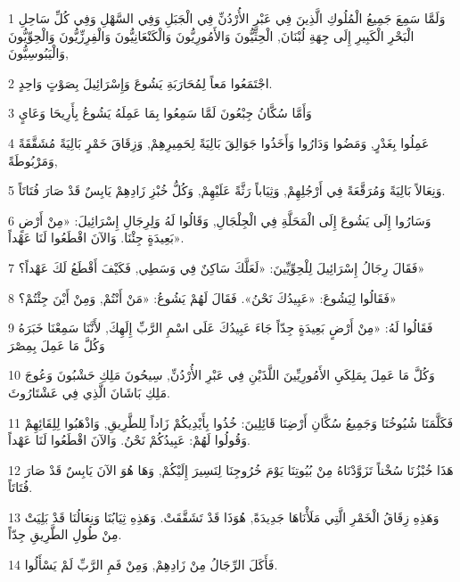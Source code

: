 \par 1 وَلَمَّا سَمِعَ جَمِيعُ الْمُلُوكِ الَّذِينَ فِي عَبْرِ الأُرْدُنِّ فِي الْجَبَلِ وَفِي السَّهْلِ وَفِي كُلِّ سَاحِلِ الْبَحْرِ الْكَبِيرِ إِلَى جِهَةِ لُبْنَانَ, الْحِثِّيُّونَ وَالأَمُورِيُّونَ وَالْكَنْعَانِيُّونَ وَالْفِرِزِّيُّونَ وَالْحِوِّيُّونَ وَالْيَبُوسِيُّونَ,
\par 2 اجْتَمَعُوا مَعاً لِمُحَارَبَةِ يَشُوعَ وَإِسْرَائِيلَ بِصَوْتٍ وَاحِدٍ.
\par 3 وَأَمَّا سُكَّانُ جِبْعُونَ لَمَّا سَمِعُوا بِمَا عَمِلَهُ يَشُوعُ بِأَرِيحَا وَعَايٍ
\par 4 عَمِلُوا بِغَدْرٍ, وَمَضُوا وَدَارُوا وَأَخَذُوا جَوَالِقَ بَالِيَةً لِحَمِيرِهِمْ, وَزِقَاقَ خَمْرٍ بَالِيَةً مُشَقَّقَةً وَمَرْبُوطَةً,
\par 5 وَنِعَالاً بَالِيَةً وَمُرَقَّعَةً فِي أَرْجُلِهِمْ, وَثِيَاباً رَثَّةً عَلَيْهِمْ, وَكُلُّ خُبْزِ زَادِهِمْ يَابِسٌ قَدْ صَارَ فُتَاتَاً.
\par 6 وَسَارُوا إِلَى يَشُوعَ إِلَى الْمَحَلَّةِ فِي الْجِلْجَالِ, وَقَالُوا لَهُ وَلِرِجَالِ إِسْرَائِيلَ: «مِنْ أَرْضٍ بَعِيدَةٍ جِئْنَا. وَالآنَ اقْطَعُوا لَنَا عَهْداً».
\par 7 فَقَالَ رِجَالُ إِسْرَائِيلَ لِلْحِوِّيِّينَ: «لَعَلَّكَ سَاكِنٌ فِي وَسَطِي, فَكَيْفَ أَقْطَعُ لَكَ عَهْداً؟»
\par 8 فَقَالُوا لِيَشُوعَ: «عَبِيدُكَ نَحْنُ». فَقَالَ لَهُمْ يَشُوعُ: «مَنْ أَنْتُمْ, وَمِنْ أَيْنَ جِئْتُمْ؟»
\par 9 فَقَالُوا لَهُ: «مِنْ أَرْضٍ بَعِيدَةٍ جِدّاً جَاءَ عَبِيدُكَ عَلَى اسْمِ الرَّبِّ إِلَهِكَ, لأَنَّنَا سَمِعْنَا خَبَرَهُ وَكُلَّ مَا عَمِلَ بِمِصْرَ
\par 10 وَكُلَّ مَا عَمِلَ بِمَلِكَيِ الأَمُورِيِّينَ اللَّذَيْنِ فِي عَبْرِ الأُرْدُنِّ, سِيحُونَ مَلِكِ حَشْبُونَ وَعُوجَ مَلِكِ بَاشَانَ الَّذِي فِي عَشْتَارُوثَ.
\par 11 فَكَلَّمَنَا شُيُوخُنَا وَجَمِيعُ سُكَّانِ أَرْضِنَا قَائِلِينَ: خُذُوا بِأَيْدِيكُمْ زَاداً لِلطَّرِيقِ, وَاذْهَبُوا لِلِقَائِهِمْ وَقُولُوا لَهُمْ: عَبِيدُكُمْ نَحْنُ. وَالآنَ اقْطَعُوا لَنَا عَهْداً.
\par 12 هَذَا خُبْزُنَا سُخْناً تَزَوَّدْنَاهُ مِنْ بُيُوتِنَا يَوْمَ خُرُوجِنَا لِنَسِيرَ إِلَيْكُمْ, وَهَا هُوَ الآنَ يَابِسٌ قَدْ صَارَ فُتَاتَاً.
\par 13 وَهَذِهِ زِقَاقُ الْخَمْرِ الَّتِي مَلَأْنَاهَا جَدِيدَةً, هُوَذَا قَدْ تَشَقَّقَتْ. وَهَذِهِ ثِيَابُنَا وَنِعَالُنَا قَدْ بَلِيَتْ مِنْ طُولِ الطَّرِيقِ جِدّاً.
\par 14 فَأَكَلَ الرِّجَالُ مِنْ زَادِهِمْ, وَمِنْ فَمِ الرَّبِّ لَمْ يَسْأَلُوا.
